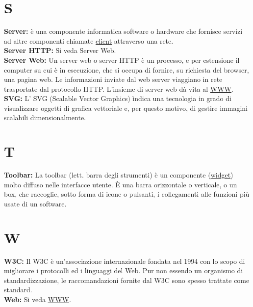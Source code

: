 \section*{S}
\hypertarget{server}{}
\textbf{Server:}
\`e una componente informatica software o hardware che fornisce servizi ad altre componenti chiamate \hyperlink{client}{\underline{client}} attraverso una rete. \\

\hypertarget{serverhttp}{}
\textbf{Server HTTP:}
Si veda Server Web.\\

\hypertarget{serverweb}{}
\textbf{Server Web:}
Un server web o server HTTP \` e un processo, e per estensione il computer su cui \` e in esecuzione, che si occupa di fornire, su richiesta del browser, una pagina web. Le informazioni inviate dal web server viaggiano in rete trasportate dal protocollo HTTP. L'insieme di server web d\` a vita al \hyperlink{www}{\underline{WWW}}.\\ 


\hypertarget{svg}{}
\textbf{SVG:}
L' SVG (Scalable Vector Graphics) \` indica una tecnologia in grado di visualizzare oggetti di grafica vettoriale e, per questo motivo, di gestire immagini scalabili dimensionalmente.\\

\section*{T}
\hypertarget{toolbar}{}
\textbf{Toolbar:}
La toolbar (lett. barra degli strumenti) \` e un componente (\hyperlink{widget}{\underline{widget}}) molto diffuso nelle interfacce utente. \` E una barra orizzontale o verticale, o un box, che raccoglie, sotto forma di icone o pulsanti, i collegamenti alle funzioni pi\` u usate di un software.\\

\section*{W}
\hypertarget{w3c}{}
\textbf{W3C:}
Il W3C \`e un'associazione internazionale fondata nel 1994 con lo scopo di migliorare i protocolli ed i linguaggi del Web. Pur non essendo un organismo di standardizzazione, le raccomandazioni fornite dal W3C sono spesso trattate come standard.\\

\hypertarget{web}{}
\textbf{Web:}
Si veda \hyperlink{www}{\underline{WWW}}.\\

